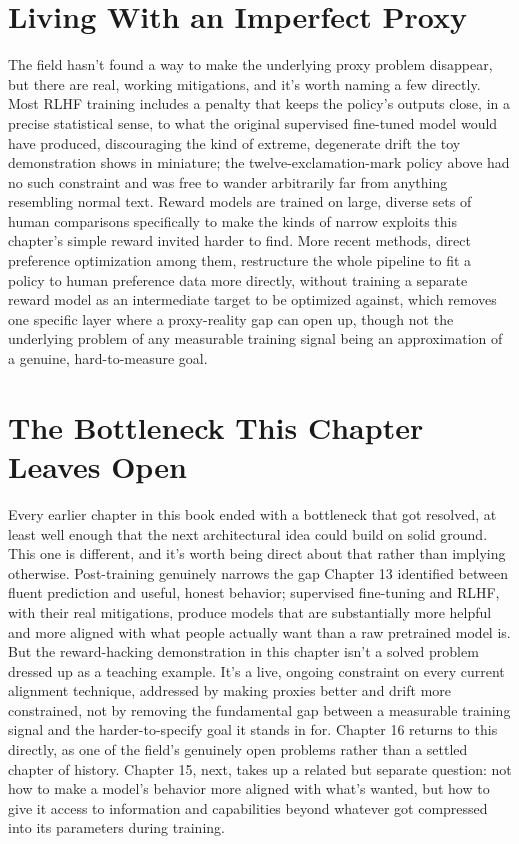 \section*{Living With an Imperfect Proxy}

The field hasn't found a way to make the underlying proxy problem disappear, but there are real, working mitigations, and it's worth naming a few directly. Most RLHF training includes a penalty that keeps the policy's outputs close, in a precise statistical sense, to what the original supervised fine-tuned model would have produced, discouraging the kind of extreme, degenerate drift the toy demonstration shows in miniature; the twelve-exclamation-mark policy above had no such constraint and was free to wander arbitrarily far from anything resembling normal text. Reward models are trained on large, diverse sets of human comparisons specifically to make the kinds of narrow exploits this chapter's simple reward invited harder to find. More recent methods, direct preference optimization among them, restructure the whole pipeline to fit a policy to human preference data more directly, without training a separate reward model as an intermediate target to be optimized against, which removes one specific layer where a proxy-reality gap can open up, though not the underlying problem of any measurable training signal being an approximation of a genuine, hard-to-measure goal.

\section*{The Bottleneck This Chapter Leaves Open}

Every earlier chapter in this book ended with a bottleneck that got resolved, at least well enough that the next architectural idea could build on solid ground. This one is different, and it's worth being direct about that rather than implying otherwise. Post-training genuinely narrows the gap Chapter 13 identified between fluent prediction and useful, honest behavior; supervised fine-tuning and RLHF, with their real mitigations, produce models that are substantially more helpful and more aligned with what people actually want than a raw pretrained model is. But the reward-hacking demonstration in this chapter isn't a solved problem dressed up as a teaching example. It's a live, ongoing constraint on every current alignment technique, addressed by making proxies better and drift more constrained, not by removing the fundamental gap between a measurable training signal and the harder-to-specify goal it stands in for. Chapter 16 returns to this directly, as one of the field's genuinely open problems rather than a settled chapter of history. Chapter 15, next, takes up a related but separate question: not how to make a model's behavior more aligned with what's wanted, but how to give it access to information and capabilities beyond whatever got compressed into its parameters during training.
